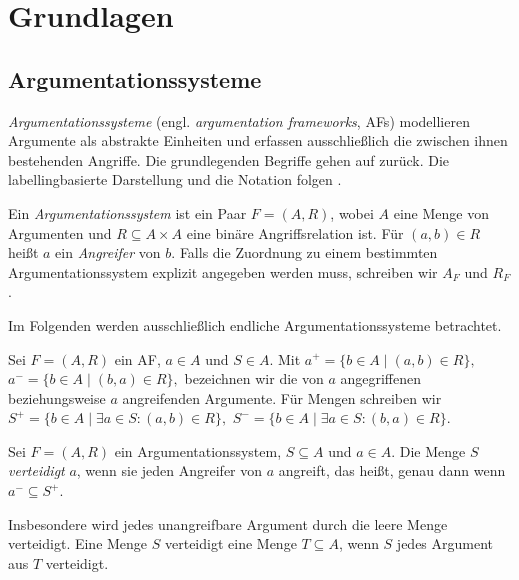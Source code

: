 \chapter{Grundlagen}
\label{ch:grundlagen}
\section{Argumentationssysteme}
\label{sec:af}

\emph{Argumentationssysteme} (engl. \emph{argumentation frameworks}, AFs)
modellieren Argumente als abstrakte Einheiten und erfassen ausschließlich die
zwischen ihnen bestehenden Angriffe. Die grundlegenden Begriffe gehen auf
\textcite{dung:1995:af} zurück. Die labellingbasierte Darstellung und die
Notation folgen \textcite{bluemel:2025:independence-aba}.

\begin{Definition}
    \label{def:af}
    Ein \emph{Argumentationssystem} ist ein Paar \(F=(A,R)\), wobei \(A\)
    eine Menge von Argumenten und \(R\subseteq A\times A\) eine
    binäre Angriffsrelation ist. Für \((a,b)\in R\) heißt \(a\) ein
    \emph{Angreifer} von \(b\). Falls die Zuordnung zu einem bestimmten
    Argumentationssystem explizit angegeben werden muss, schreiben wir
    \(A_F\) und \(R_F\).
\end{Definition}
Im Folgenden werden ausschließlich endliche Argumentationssysteme betrachtet.
\begin{Definition}
    \label{def:attack/defense}
    Sei \(F = (A,R)\) ein AF, \(a \in A\) und \(S \in A\).     
    Mit
    \(
        a^+ = \{b\in A \mid (a,b)\in R\},
    \)
    \(
        a^- = \{b\in A \mid (b,a)\in R\},
    \)
    bezeichnen wir die von \(a\) angegriffenen beziehungsweise \(a\) angreifenden Argumente. 
    Für Mengen schreiben wir
    \(
        S^+ = \{b\in A \mid \exists a\in S\colon (a,b)\in R\},
    \)
    \(
        S^- = \{b\in A \mid \exists a\in S\colon (b,a)\in R\}
    \).
\end{Definition}

\begin{Definition}
    \label{def:defense}
    Sei \(F=(A,R)\) ein Argumentationssystem, \(S\subseteq A\) und
    \(a\in A\). Die Menge \(S\) \emph{verteidigt} \(a\), wenn sie jeden
    Angreifer von \(a\) angreift, das heißt, genau dann wenn \(a^-\subseteq S^+\).
\end{Definition}
Insbesondere wird jedes unangreifbare Argument durch die leere Menge
verteidigt. Eine Menge \(S\) verteidigt eine Menge \(T\subseteq A\), wenn
\(S\) jedes Argument aus \(T\) verteidigt.

